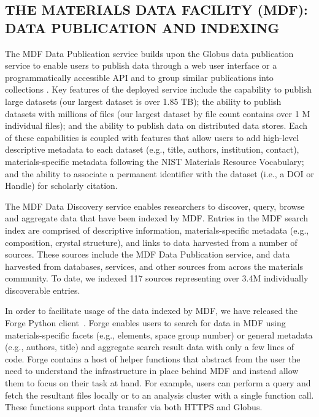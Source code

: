 \documentclass{aip-cp}
\newcommand\ryan[1]{}
\newcommand\ryan[1]{{\color{green}[Ryan: #1]}}
\begin{document}


\subsection{THE MATERIALS DATA FACILITY (MDF): DATA PUBLICATION AND INDEXING}

The MDF Data Publication service builds upon the Globus data
publication service \cite{chard2015globus} to enable
users to publish data through a web user interface or a
programmatically accessible API and to group similar publications into
collections \cite{MDF2016}. Key features of the deployed service include the capability to
publish large datasets (our largest dataset is over 1.85 TB); the ability to
publish datasets with millions of files (our largest dataset by file count
contains over 1 M individual files); and the ability to publish data on
distributed data stores. Each of these capabilities is coupled with
features that allow users to add high-level descriptive metadata to each dataset
(e.g., title, authors, institution, contact), materials-specific metadata
following the NIST Materials Resource Vocabulary; and the ability to associate
a permanent identifier with the dataset (i.e., a DOI or Handle) for scholarly
citation.

The MDF Data Discovery service enables researchers to discover, query, browse
and aggregate data that have been indexed by MDF. Entries in the MDF search
index are comprised of descriptive information, materials-specific metadata
(e.g., composition, crystal structure), and links to data harvested from a
number of sources. These sources include the MDF Data Publication service, and
data harvested from databases, services, and other sources from across the
materials community. To date, we indexed 117 sources representing over 3.4M
individually discoverable entries.

In order to facilitate usage of the data indexed by MDF, we have released the
Forge Python client~\cite{forge}. Forge enables users to search for data in MDF using
materials-specific facets (e.g., elements, space group number) or general
metadata (e.g., authors, title) and aggregate search result data with only a
few lines of code. Forge contains a host of helper functions that
abstract from the user the need to understand the infrastructure in place
behind MDF and instead allow them to focus on their task at hand. For example,
users can perform a query and fetch the resultant files locally or to an
analysis cluster with a single function call. These functions support data
transfer via both HTTPS and Globus.
\end{document}
